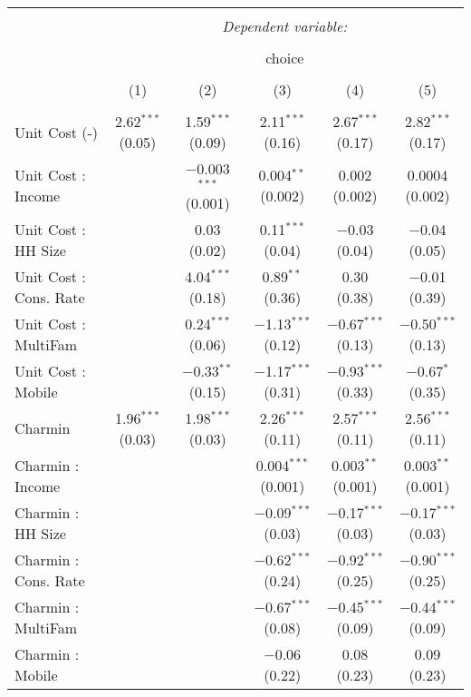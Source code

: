 
\begin{table}[!htbp] \centering 
  \caption{} 
  \label{tab:mnlMinneapolisObsHet} 
\begin{tabular}{@{\extracolsep{5pt}}lccccc} 
\\[-1.8ex]\hline 
\hline \\[-1.8ex] 
 & \multicolumn{5}{c}{\textit{Dependent variable:}} \\ 
\cline{2-6} 
\\[-1.8ex] & \multicolumn{5}{c}{choice} \\ 
\\[-1.8ex] & (1) & (2) & (3) & (4) & (5)\\ 
\hline \\[-1.8ex] 
 Unit Cost (-) & 2.62$^{***}$ (0.05) & 1.59$^{***}$ (0.09) & 2.11$^{***}$ (0.16) & 2.67$^{***}$ (0.17) & 2.82$^{***}$ (0.17) \\ 
  Unit Cost : Income &  & $-$0.003$^{***}$ (0.001) & 0.004$^{**}$ (0.002) & 0.002 (0.002) & 0.0004 (0.002) \\ 
  Unit Cost : HH Size &  & 0.03 (0.02) & 0.11$^{***}$ (0.04) & $-$0.03 (0.04) & $-$0.04 (0.05) \\ 
  Unit Cost : Cons. Rate &  & 4.04$^{***}$ (0.18) & 0.89$^{**}$ (0.36) & 0.30 (0.38) & $-$0.01 (0.39) \\ 
  Unit Cost : MultiFam &  & 0.24$^{***}$ (0.06) & $-$1.13$^{***}$ (0.12) & $-$0.67$^{***}$ (0.13) & $-$0.50$^{***}$ (0.13) \\ 
  Unit Cost : Mobile &  & $-$0.33$^{**}$ (0.15) & $-$1.17$^{***}$ (0.31) & $-$0.93$^{***}$ (0.33) & $-$0.67$^{*}$ (0.35) \\ 
  Charmin & 1.96$^{***}$ (0.03) & 1.98$^{***}$ (0.03) & 2.26$^{***}$ (0.11) & 2.57$^{***}$ (0.11) & 2.56$^{***}$ (0.11) \\ 
  Charmin : Income &  &  & 0.004$^{***}$ (0.001) & 0.003$^{**}$ (0.001) & 0.003$^{**}$ (0.001) \\ 
  Charmin : HH Size &  &  & $-$0.09$^{***}$ (0.03) & $-$0.17$^{***}$ (0.03) & $-$0.17$^{***}$ (0.03) \\ 
  Charmin : Cons. Rate &  &  & $-$0.62$^{***}$ (0.24) & $-$0.92$^{***}$ (0.25) & $-$0.90$^{***}$ (0.25) \\ 
  Charmin : MultiFam &  &  & $-$0.67$^{***}$ (0.08) & $-$0.45$^{***}$ (0.09) & $-$0.44$^{***}$ (0.09) \\ 
  Charmin : Mobile &  &  & $-$0.06 (0.22) & 0.08 (0.23) & 0.09 (0.23) \\ 

\end{tabular}
\end{table}
